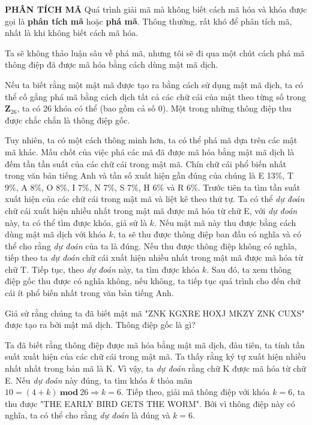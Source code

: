 \noindent \textcolor{Mycolor}{\textbf{PHÂN TÍCH MÃ}} Quá trình giải mã mà không biết cách mã hóa và khóa được gọi là \textbf{phân tích mã} hoặc \textbf{phá mã}. Thông thường, rất khó để phân tích mã, nhất là khi không biết cách mã hóa.

Ta sẽ không thảo luận sâu về phá mã, nhưng tôi sẽ đi qua một chút cách phá mã thông điệp đã được mã hóa bằng cách dùng mật mã dịch.

Nếu ta biết rằng một mật mã được tạo ra bằng cách sử dụng mật mã dịch, ta có thể cố gắng phá mã bằng cách dịch tất cả các chữ cái của mật theo từng số trong $\mathbf{Z}_{26}$, ta có 26 khóa có thể (bao gồm cả số 0). Một trong những thông điệp thu được chắc chắn là thông điệp gốc.

Tuy nhiên, ta có một cách thông minh hơn, ta có thể phá mã dựa trên các mật mã khác. Mấu chốt của việc phá các mã đã được mã hóa bằng mật mã dịch là đếm tần tần suất của các chữ cái trong mật mã. Chín chữ cái phổ biến nhất trong văn bản tiếng Anh và tần số xuất hiện gần đúng của chúng là E 13\%, T 9\%, A 8\%, O 8\%, I 7\%, N 7\%, S 7\%, H 6\% và R 6\%. Trước tiên ta tìm tần suất xuất hiện của các chữ cái trong mật mã và liệt kê theo thứ tự. Ta có thể \textit{dự đoán} chữ cái xuất hiện nhiều nhất trong mật mã được mã hóa từ chữ E, với \textit{dự đoán} này, ta có thể tìm được khóa, giả sử là $k$. Nếu mật mã này thu được bằng cách dùng mật mã dịch với khóa $k$, ta sẽ thu được thông điệp ban đầu có nghĩa và có thể cho rằng \textit{dự đoán} của ta là đúng. Nếu thu được thông điệp không có nghĩa, tiếp theo ta \textit{dự đoán} chữ cái xuất hiện nhiều nhất trong mật mã được mã hóa từ chữ T. Tiếp tục, theo \textit{dự đoán} này, ta tìm được khóa $k$. Sau đó, ta xem thông điệp gốc thu được có nghĩa không, nếu không, ta tiếp tục quá trình cho đến chữ cái ít phổ biến nhất trong văn bản tiếng Anh.

\begin{example}
    Giả sử rằng chúng ta đã biết mật mã "ZNK KGXRE HOXJ MKZY ZNK CUXS" được tạo ra bởi mật mã dịch. Thông điệp gốc là gì?
\end{example}
\begin{solution}
    Ta đã biết rằng thông điệp được mã hóa bằng mật mã dịch, đàu tiên, ta tính tần suất xuất hiện của các chữ cái trong mật mã. Ta thấy rằng ký tự xuất hiện nhiều nhất nhất trong bản mã là K. Vì vậy, ta \textit{dự đoán} rằng chữ K được mã hóa từ chữ E. Nếu \textit{dự đoán} này đúng, ta tìm khóa $k$ thỏa mãn $10 = (4+k)\ \mathbf{mod}\ 26  \Rightarrow k = 6$. Tiếp theo, giải mã thông điệp với khóa $k=6$, ta thu được "THE EARLY BIRD GETS THE WORM". Bởi vì thông điệp này có nghĩa, ta có thể cho rằng \textit{dự đoán} là đúng và $k=6$.
\end{solution}


